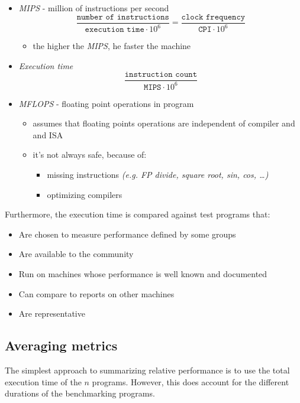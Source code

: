 \documentclass[english]{article}
\begin{document}
\begin{itemize}
  \item \textit{MIPS} - million of instructions per second
        \[ \dfrac{\texttt{number\ of\ instructions}}{\texttt{execution\ time} \cdot 10^6} = \dfrac{\texttt{clock\ frequency}}{\texttt{CPI} \cdot 10^6} \]
        \begin{itemize}
          \item the higher the \textit{MIPS}, he faster the machine
        \end{itemize}
  \item \textit{Execution time}
        \[ \dfrac{\texttt{instruction\ count}}{\texttt{MIPS} \cdot 10^6} \]
  \item \textit{MFLOPS} - floating point operations in program
        \begin{itemize}
          \item assumes that floating points operations are independent of compiler and and ISA
          \item it's not always safe, because of:
                \begin{itemize}
                  \item missing instructions \textit{(e.g. FP divide, square root, sin, cos, \dots)}
                  \item optimizing compilers
                \end{itemize}
        \end{itemize}
\end{itemize}

Furthermore, the execution time is compared against test programs that:

\begin{itemize}
  \item Are chosen to measure performance defined by some groups
  \item Are available to the community
  \item Run on machines whose performance is well known and documented
  \item Can compare to reports on other machines
  \item Are representative
\end{itemize}

\subsection{Averaging metrics}

The simplest approach to summarizing relative performance is to use the total execution time of the \(n\) programs.
However, this does account for the different durations of the benchmarking programs.
\end{document}
